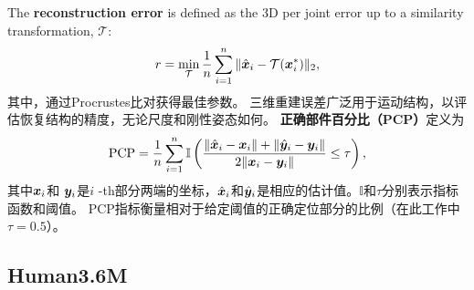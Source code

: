 The \textbf{reconstruction error} is defined as the 3D per joint error up to a similarity transformation, $\mathcal{T}$:
\begin{align*}
r = \min_{\mathcal{T}}\frac{1}{n}\sum_{i=1}^n\|\hat{{\bm{x}}}_i-\mathcal{T}({\bm{x}}_i^*)\|_2,
\end{align*}
其中，通过Procrustes比对获得最佳参数。 三维重建误差广泛用于运动结构，以评估恢复结构的精度，无论尺度和刚性姿态如何。
\textbf{正确部件百分比（PCP）}定义为
\begin{align}\label{eq:pcp}
\mbox{PCP} = \frac{1}{n}\sum_{i=1}^n \mathbb{I}\left(\frac{\|\hat{{\bm{x}}}_i-{\bm{x}}_i\|+\|\hat{{\bm{y}}}_i-{\bm{y}}_i\|}{2\|{\bm{x}}_i-{\bm{y}}_i\|}\leq \tau\right),
\end{align}
其中${\bm{x}}_i$和 ${\bm{y}}_i$是$i$ -th部分两端的坐标，$\hat{{\bm{x}}}_i$和$\hat{{\bm{y}}}_i$是相应的估计值。$\mathbb{I}$和$\tau$分别表示指标函数和阈值。 PCP指标衡量相对于给定阈值的正确定位部分的比例（在此工作中$\tau=0.5$）。

\subsection{Human3.6M}
\label{sec:h36m}

